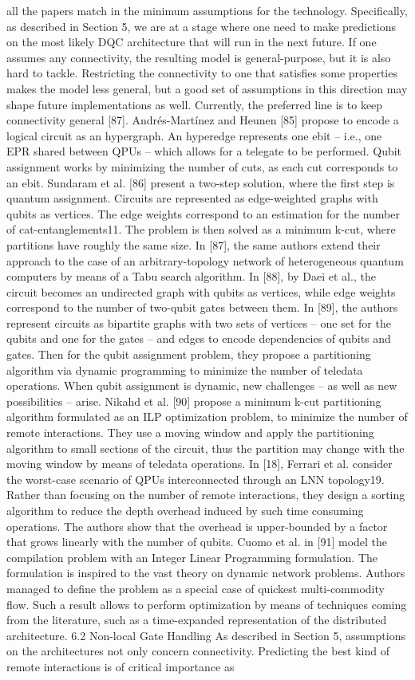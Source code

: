 all the papers match in the minimum assumptions for the technology. Specifically, as described in Section 5, we are at a stage where one need to make predictions on the most likely DQC architecture that will run in the next future. If one assumes any connectivity, the resulting model is general-purpose, but it is also hard to tackle. Restricting the connectivity to one that satisfies some properties makes the model less general, but a good set of assumptions in this direction may shape future implementations as well. Currently, the preferred line is to keep connectivity general [87]. Andrés-Martínez and Heunen [85] propose to encode a logical circuit as an hypergraph. An hyperedge represents one ebit – i.e., one EPR shared between QPUs – which allows for a telegate to be performed. Qubit assignment works by minimizing the number of cuts, as each cut corresponds to an ebit. Sundaram et al. [86] present a two-step solution, where the first step is quantum assignment. Circuits are represented as edge-weighted graphs with qubits as vertices. The edge weights correspond to an estimation for the number of cat-entanglements11. The problem is then solved as a minimum k-cut, where partitions have roughly the same size. In [87], the same authors extend their approach to the case of an arbitrary-topology network of heterogeneous quantum computers by means of a Tabu search algorithm. In [88], by Daei et al., the circuit becomes an undirected graph with qubits as vertices, while edge weights correspond to the number of two-qubit gates between them. In [89], the authors represent circuits as bipartite graphs with two sets of vertices – one set for the qubits and one for the gates – and edges to encode dependencies of qubits and gates. Then for the qubit assignment problem, they propose a partitioning algorithm via dynamic programming to minimize the number of teledata operations. When qubit assignment is dynamic, new challenges – as well as new possibilities – arise. Nikahd et al. [90] propose a minimum k-cut partitioning algorithm formulated as an ILP optimization problem, to minimize the number of remote interactions. They use a moving window and apply the partitioning algorithm to small sections of the circuit, thus the partition may change with the moving window by means of teledata operations. In [18], Ferrari et al. consider the worst-case scenario of QPUs interconnected through an LNN topology19. Rather than focusing on the number of remote interactions, they design a sorting algorithm to reduce the depth overhead induced by such time consuming operations. The authors show that the overhead is upper-bounded by a factor that grows linearly with the number of qubits. Cuomo et al. in [91] model the compilation problem with an Integer Linear Programming formulation. The formulation is inspired to the vast theory on dynamic network problems. Authors managed to define the problem as a special case of quickest multi-commodity flow. Such a result allows to perform optimization by means of techniques coming from the literature, such as a time-expanded representation of the distributed architecture. 6.2 Non-local Gate Handling As described in Section 5, assumptions on the architectures not only concern connectivity. Predicting the best kind of remote interactions is of critical importance as 